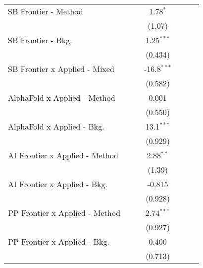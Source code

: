 \begin{tabular}{lcccccc}
   SB Frontier - Method           &          &              & 1.78$^{*}$    &                &        &   \\   
                                  &          &              & (1.07)        &                &        &   \\   
   SB Frontier - Bkg.             &          &              & 1.25$^{***}$  &                &        &   \\   
                                  &          &              & (0.434)       &                &        &   \\   
   SB Frontier x Applied - Mixed  &          &              & -16.8$^{***}$ &                &        &   \\   
                                  &          &              & (0.582)       &                &        &   \\   
   AlphaFold x Applied - Method   &          &              & 0.001         &                &        &   \\   
                                  &          &              & (0.550)       &                &        &   \\   
   AlphaFold x Applied - Bkg.     &          &              & 13.1$^{***}$  &                &        &   \\   
                                  &          &              & (0.929)       &                &        &   \\   
   AI Frontier x Applied - Method &          &              & 2.88$^{**}$   &                &        &   \\   
                                  &          &              & (1.39)        &                &        &   \\   
   AI Frontier x Applied - Bkg.   &          &              & -0.815        &                &        &   \\   
                                  &          &              & (0.928)       &                &        &   \\   
   PP Frontier x Applied - Method &          &              & 2.74$^{***}$  &                &        &   \\   
                                  &          &              & (0.927)       &                &        &   \\   
   PP Frontier x Applied - Bkg.   &          &              & 0.400         &                &        &   \\   
                                  &          &              & (0.713)       &                &        &   \\   

\end{tabular}
